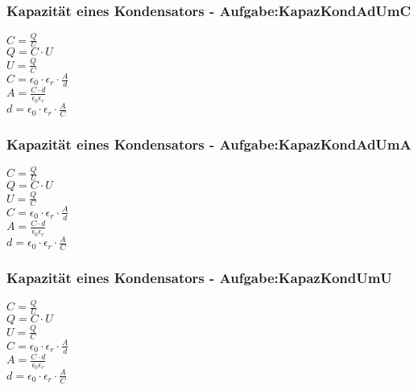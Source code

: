 \subsubsection{Kapazität eines Kondensators - Aufgabe:KapazKondAdUmC} 
\begin{minipage}{0.45\textwidth} 
$ C = \frac{Q}{U} $\\ 
$ Q = C\cdot U $\\ 
$ U = \frac{Q}{C} $\\ 
$ C = \epsilon _{0} \cdot \epsilon _{r} \cdot \frac{A}{d} $\\ 
$ A = \frac{C\cdot d}{\epsilon _{0} \epsilon _{r} } $\\ 
$ d = \epsilon _{0} \cdot \epsilon _{r} \cdot \frac{A}{C} $\\ 
\end{minipage} 
\begin{minipage}{0.45\textwidth} 
 
\end{minipage} 
\subsubsection{Kapazität eines Kondensators - Aufgabe:KapazKondAdUmA} 
\begin{minipage}{0.45\textwidth} 
$ C = \frac{Q}{U} $\\ 
$ Q = C\cdot U $\\ 
$ U = \frac{Q}{C} $\\ 
$ C = \epsilon _{0} \cdot \epsilon _{r} \cdot \frac{A}{d} $\\ 
$ A = \frac{C\cdot d}{\epsilon _{0} \epsilon _{r} } $\\ 
$ d = \epsilon _{0} \cdot \epsilon _{r} \cdot \frac{A}{C} $\\ 
\end{minipage} 
\begin{minipage}{0.45\textwidth} 
 
\end{minipage} 
\subsubsection{Kapazität eines Kondensators - Aufgabe:KapazKondUmU} 
\begin{minipage}{0.45\textwidth} 
$ C = \frac{Q}{U} $\\ 
$ Q = C\cdot U $\\ 
$ U = \frac{Q}{C} $\\ 
$ C = \epsilon _{0} \cdot \epsilon _{r} \cdot \frac{A}{d} $\\ 
$ A = \frac{C\cdot d}{\epsilon _{0} \epsilon _{r} } $\\ 
$ d = \epsilon _{0} \cdot \epsilon _{r} \cdot \frac{A}{C} $\\ 
\end{minipage} 
\begin{minipage}{0.45\textwidth} 
 
\end{minipage} 
